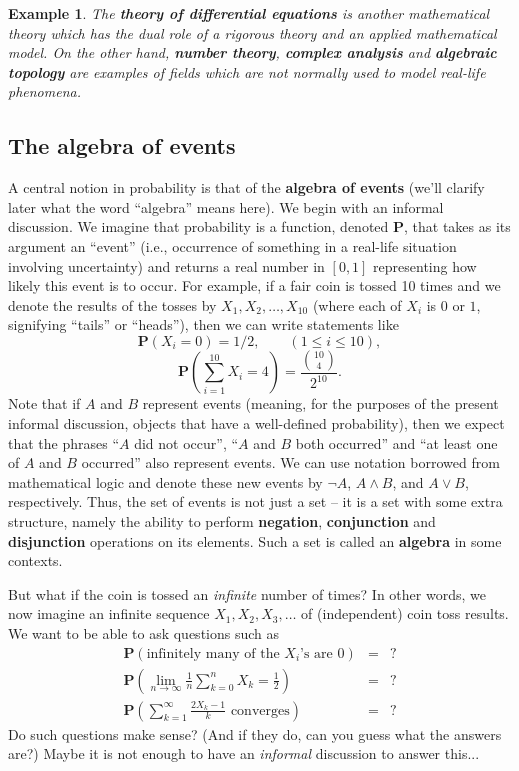 \documentclass[12pt]{article}
\newcommand{\prob}{\mathbf{P}}
\theoremstyle{example}
\newtheorem{example}[thm]{Example}
\begin{document}
\begin{example}
The \textbf{theory of differential equations} is another mathematical theory which has the dual role of a rigorous theory and an applied mathematical model. 
On the other hand, \textbf{number theory}, \textbf{complex analysis} and \textbf{algebraic topology} are examples of fields which are not normally used to model real-life phenomena.
\end{example}

\subsection{The algebra of events}

A central notion in probability is that of the \textbf{algebra of events} (we'll clarify later what the word ``algebra'' means here). We begin with an informal discussion. We imagine that probability is a function, denoted $\prob$, that takes as its argument an ``event'' (i.e., occurrence of something in a real-life situation involving uncertainty) and returns a real number in $[0,1]$ representing how likely this event is to occur. For example, if a fair coin is tossed 10 times and we denote the results of the tosses by $X_1,X_2,\ldots,X_{10}$ (where each of $X_i$ is $0$ or $1$, signifying ``tails'' or ``heads''), then we can write statements like
$$ \prob(X_i = 0) = 1/2, \qquad (1\le i\le 10),
$$
$$ \prob\left(\sum_{i=1}^{10} X_i = 4\right) = \frac{\binom{10}{4}}{2^{10}}.
$$
Note that if $A$ and $B$ represent events (meaning, for the purposes of the present informal discussion, objects that have a well-defined probability), then we expect that the phrases ``$A$ did not occur'', ``$A$ and $B$ both occurred'' and ``at least one of $A$ and $B$ occurred'' also represent events. We can use notation borrowed from mathematical logic and denote these new events by $\lnot A$, $A\wedge B$, and $A \vee B$, respectively.
Thus, the set of events is not just a set -- it is a set with some extra structure, namely the ability to perform \textbf{negation}, \textbf{conjunction} and \textbf{disjunction} operations on its elements. Such a set is called an \textbf{algebra} in some contexts.

But what if the coin is tossed an \emph{infinite} number of times? In other words, we now imagine an infinite sequence $X_1,X_2,X_3,\ldots$ of (independent) coin toss results. We want to be able to ask questions such as
\begin{eqnarray*}
\prob(\textrm{infinitely many of the $X_i$'s are 0}) &=& ? \\
\prob\left(\lim_{n\to\infty} \frac{1}{n} \sum_{k=0}^n X_k = \frac12\right) &=& ? \\
\prob\left(\sum_{k=1}^\infty \frac{2X_k-1}{k}\textrm{ converges}\right) &=& ?
\end{eqnarray*}
Do such questions make sense? (And if they do, can you guess what the answers are?) Maybe it is not enough to have an \emph{informal} discussion to answer this...
\end{document}

